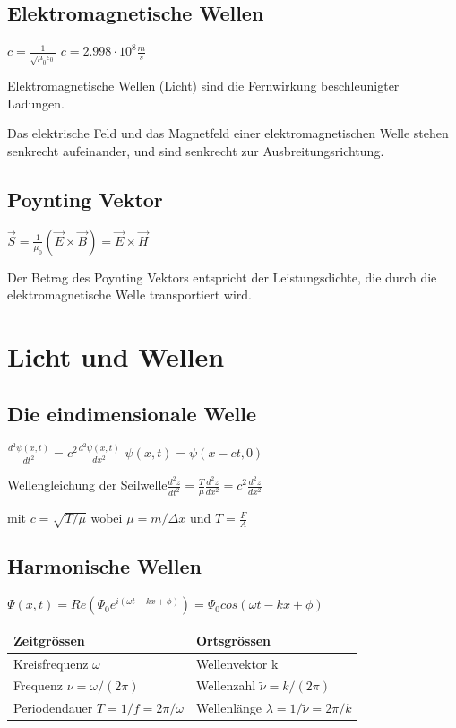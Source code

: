\documentclass[10pt,a4paper]{scrartcl}
\begin{document}
\begin{multicols*}{3}
	 
	
	\subsection{Elektromagnetische Wellen}
	
	$c=\frac{1}{\sqrt{\mu_0\epsilon_0}}$ \hfill $c=2.998\cdot 10^8\frac{m}{s}$	
	
	Elektromagnetische Wellen (Licht) sind die Fernwirkung beschleunigter Ladungen.
	
	Das elektrische Feld und das Magnetfeld einer elektromagnetischen Welle stehen senkrecht aufeinander, und sind senkrecht zur Ausbreitungsrichtung.
	
	 
	
	\subsection{Poynting Vektor}
	
	$\vec{S}=\frac{1}{\mu_0}(\vec{E}\times\vec{B})=\vec{E}\times\vec{H}$
	
	Der Betrag des Poynting Vektors entspricht der Leistungsdichte, die durch die elektromagnetische Welle transportiert wird.	

	 
	
	\section{Licht und Wellen}
	
	\subsection{Die eindimensionale Welle}
	
	$\frac{d^2\psi(x,t)}{dt^2}=c^2\frac{d^2\psi(x,t)}{dx^2}$ \hfill $\psi(x,t)=\psi(x-ct,0)$
	
	Wellengleichung der Seilwelle\hfill$\frac{d^2z}{dt^2}=\frac{T}{\mu}\frac{d^2z}{dx^2} = c^2\frac{d^2z}{dx^2}$
	
	mit $c=\sqrt{T/\mu}$ wobei $\mu = m/\Delta x$ und $T=\frac{F}{A}$
	
	 
	
	\subsection{Harmonische Wellen}
	
	$\Psi(x,t)=Re(\Psi_0e^{i(\omega t -kx + \phi)})=\Psi_0cos(\omega t - kx+\phi)$
	
	\begin{tabulary}{\linewidth}{L|L}
	\hline
	Zeitgrössen&Ortsgrössen\\
	\hline
	Kreisfrequenz $\omega$ &Wellenvektor k\\
	\hline
	Frequenz $\nu =\omega / (2\pi)$ &Wellenzahl $\tilde{\nu} =k/(2\pi)$\\
	\hline
	Periodendauer $T = 1/f=2\pi / \omega$&Wellenlänge $\lambda=1/ \tilde{\nu} =2\pi /k$\\
	\hline
	\end{tabulary}


\end{multicols*}
\end{document}
